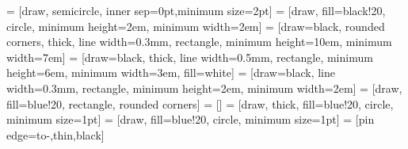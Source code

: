 \usetikzlibrary{shapes,arrows}
\usetikzlibrary{backgrounds}
\usetikzlibrary{matrix, positioning, fit}
\usetikzlibrary{patterns}

 = [draw, semicircle, inner sep=0pt,minimum size=2pt]
 = [draw, fill=black!20, circle, minimum height=2em, minimum width=2em]
 = [draw=black, rounded corners, thick, line width=0.3mm, rectangle, minimum height=10em, minimum width=7em]
 = [draw=black, thick, line width=0.5mm, rectangle, minimum height=6em, minimum width=3em, fill=white]
 = [draw=black, line width=0.3mm, rectangle, minimum height=2em, minimum width=2em]
 = [draw, fill=blue!20, rectangle, rounded corners]
 = []
 = [draw, thick, fill=blue!20, circle, minimum size=1pt]
 = [draw, fill=blue!20, circle, minimum size=1pt]
 = [pin edge={to-,thin,black}]



